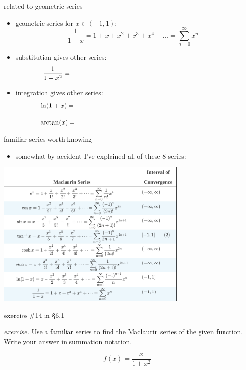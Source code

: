 \documentclass[urlcolor=blue,dvipsnames]{beamer}
\begin{document}
\begin{frame}{related to geometric series}

\begin{itemize}
\item geometric series for $x\in(-1,1)$:
    $$\frac{1}{1-x} = 1 + x + x^2 + x^3 + x^4 + \dots = \sum_{n=0}^\infty x^n$$
\item substitution gives other series:
   $$\frac{1}{1+x^2} = \hspace{80mm}$$

\bigskip
\item integration gives other series:
   $$\ln(1+x) = \hspace{80mm}$$

   $$\arctan(x) = \hspace{80mm}$$

\bigskip
\end{itemize}
\end{frame}


\begin{frame}{familiar series worth knowing}

\begin{itemize}
\item somewhat by accident I've explained all of these 8 series:
\end{itemize}

\bigskip
\hfill \includegraphics[width=0.7\textwidth]{figs/familiarseries}
\end{frame}


\begin{frame}{exercise \#14 in \S 6.1}

\noindent \emph{exercise.}  Use a familiar series to find the Maclaurin series of the given function.  Write your answer in summation notation.

$$f(x)=\frac{x}{1+x^2}$$

\vspace{50mm}
\end{frame}
\end{document}
